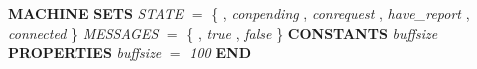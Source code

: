 %
\bsetindent
\begin{tabbing}
\bSetTabs
%
%
\bbnl
{\bf MACHINE} \bhsp{} \-\label{CommsDefs}
%
%
\bbnl
{\bf SETS} \+ \bbnl
{\em STATE\/}\label{STATE}  $=$  \{  , {\em conpending\/} , {\em conrequest\/} , {\em have\_report\/} , {\em connected\/} \- \}  \bStatementSemiColon \bnl
{\em MESSAGES\/}\label{MESSAGES}  $=$  \{  , {\em true\/} , {\em false\/} \- \}  \-
%
%
\bbnl
{\bf CONSTANTS} \+ \bbnl
{\em buffsize\/}\label{buffsize}  \-
%
%
\bbnl
{\bf PROPERTIES} \+ \bbnl
{\em buffsize\/} $=$ {\em 100\/} \-
%
%
\bbnl
{\bf END} 
\end{tabbing}
\bresetindent
